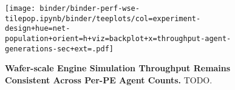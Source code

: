 \begin{figure}
\texttt{[image: binder/binder-perf-wse-tilepop.ipynb/binder/teeplots/col=experiment-design+hue=net-population+orient=h+viz=backplot+x=throughput-agent-generations-sec+ext=.pdf]}

\caption{
\textbf{Wafer-scale Engine Simulation Throughput Remains Consistent Across Per-PE Agent Counts.}
\footnotesize
TODO.
}
\label{fig:perf-tilepop}

\end{figure}
